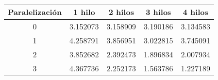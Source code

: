 \begin{tabular}{|c|c|c|c|c|}
\hline Paralelización & 1 hilo & 2 hilos & 3 hilos & 4 hilos
\\ 
\hline 0 & 3.152073 & 3.158909 & 3.190186 & 3.134583
\\ 
\hline 1 & 4.258791 & 3.856951 & 3.022815 & 3.745091
\\ 
\hline 2 & 3.852682 & 2.392473 & 1.896834 & 2.007934
\\ 
\hline 3 & 4.367736 & 2.252173 & 1.563786 & 1.227189
\\ 
\hline\end{tabular}